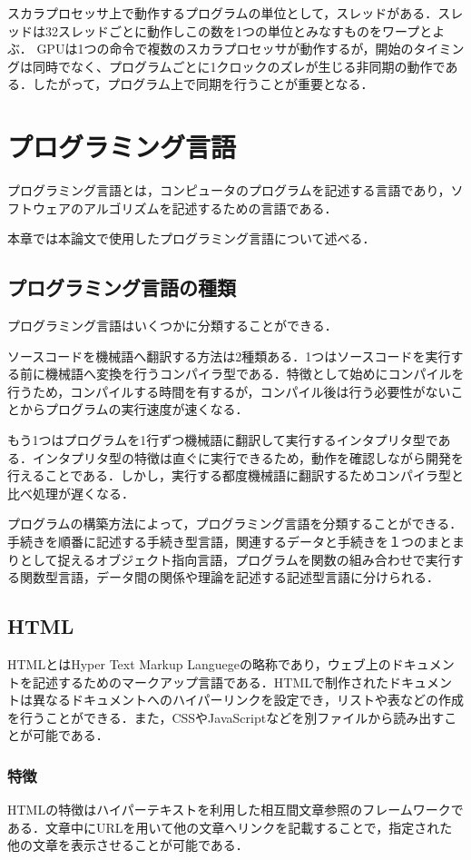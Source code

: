\documentclass[a4j,12pt]{jsarticle}
\begin{document}
スカラプロセッサ上で動作するプログラムの単位として，スレッドがある．スレッドは32スレッドごとに動作しこの数を1つの単位とみなすものをワープとよぶ．
GPUは1つの命令で複数のスカラプロセッサが動作するが，開始のタイミングは同時でなく、プログラムごとに1クロックのズレが生じる非同期の動作である．したがって，プログラム上で同期を行うことが重要となる．
\newpage

\section{プログラミング言語}
プログラミング言語とは，コンピュータのプログラムを記述する言語であり，ソフトウェアのアルゴリズムを記述するための言語である．

本章では本論文で使用したプログラミング言語について述べる．
\subsection{プログラミング言語の種類}
プログラミング言語はいくつかに分類することができる．

ソースコードを機械語へ翻訳する方法は2種類ある．1つはソースコードを実行する前に機械語へ変換を行うコンパイラ型である．特徴として始めにコンパイルを行うため，コンパイルする時間を有するが，コンパイル後は行う必要性がないことからプログラムの実行速度が速くなる．

もう1つはプログラムを1行ずつ機械語に翻訳して実行するインタプリタ型である．インタプリタ型の特徴は直ぐに実行できるため，動作を確認しながら開発を行えることである．しかし，実行する都度機械語に翻訳するためコンパイラ型と比べ処理が遅くなる．

プログラムの構築方法によって，プログラミング言語を分類することができる．手続きを順番に記述する手続き型言語，関連するデータと手続きを１つのまとまりとして捉えるオブジェクト指向言語，プログラムを関数の組み合わせで実行する関数型言語，データ間の関係や理論を記述する記述型言語に分けられる．

\subsection{HTML}
HTMLとはHyper Text Markup Languegeの略称であり，ウェブ上のドキュメントを記述するためのマークアップ言語である．HTMLで制作されたドキュメントは異なるドキュメントへのハイパーリンクを設定でき，リストや表などの作成を行うことができる．また，CSSやJavaScriptなどを別ファイルから読み出すことが可能である．
\subsubsection{特徴}
HTMLの特徴はハイパーテキストを利用した相互間文章参照のフレームワークである．文章中にURLを用いて他の文章へリンクを記載することで，指定された他の文章を表示させることが可能である．
\end{document}
